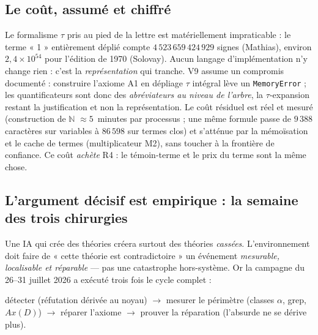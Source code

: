 \subsection{Le coût, assumé et chiffré}

Le formalisme $\tau$ pris au pied de la lettre est matériellement impraticable :
le terme « 1 » entièrement déplié compte $4\,523\,659\,424\,929$ signes
(Mathias), environ $2{,}4\times10^{54}$ pour l'édition de 1970 (Solovay). Aucun
langage d'implémentation n'y change rien : c'est la \emph{représentation} qui
tranche. V9 assume un compromis documenté : construire l'axiome A1 en dépliage
$\tau$ intégral lève un \texttt{MemoryError} ; les quantificateurs sont donc des
\emph{abréviateurs au niveau de l'arbre}, la $\tau$-expansion restant la
justification et non la représentation. Le coût résiduel est réel et mesuré
(construction de $\mathbb{N}$ $\approx 5$~minutes par processus ; une même
formule passe de $9\,388$ caractères sur variables à $86\,598$ sur termes clos)
et s'atténue par la mémoïsation et le cache de termes (multiplicateur M2), sans
toucher à la frontière de confiance. Ce coût \emph{achète} R4 : le témoin-terme
et le prix du terme sont la même chose.

\subsection{L'argument décisif est empirique : la semaine des trois chirurgies}

Une IA qui crée des théories créera surtout des théories \emph{cassées}.
L'environnement doit faire de « cette théorie est contradictoire » un événement
\emph{mesurable, localisable et réparable} --- pas une catastrophe hors-système.
Or la campagne du 26--31 juillet 2026 a exécuté trois fois le cycle complet :

\begin{center}
détecter (réfutation dérivée au noyau) $\to$ mesurer le périmètre (classes
$\alpha$, grep, $Ax(D)$) $\to$ réparer l'axiome $\to$ prouver la réparation
(l'absurde ne se dérive plus).
\end{center}

